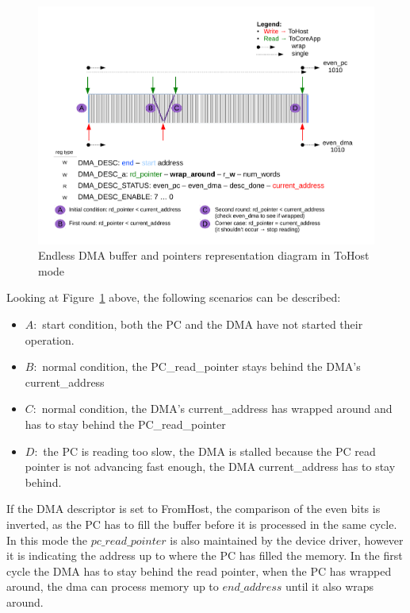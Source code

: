 \begin{figure}[H]
\centering
\includegraphics[width=1\textwidth, page=1]{figures/Endless_DMA_diagram.pdf}
\caption{Endless DMA buffer and pointers representation diagram in ToHost mode}
\label{fig:endless_dma_diagram_tohost}
\end{figure}

Looking at Figure~\ref{fig:endless_dma_diagram_tohost} above, the following scenarios can be described:
\begin{itemize}
	\item $A:$ start condition, both the PC and the DMA have not started their operation.
	\item $B:$ normal condition, the PC\_read\_pointer stays behind the DMA's current\_address
	\item $C:$ normal condition, the DMA's current\_address has wrapped around and has to stay behind the PC\_read\_pointer
	\item $D:$ the PC is reading too slow, the DMA is stalled because the PC read pointer is not advancing fast enough, the DMA current\_address has to stay behind.
\end{itemize}

\newpage
If the DMA descriptor is set to FromHost, the comparison of the even bits is inverted, as the PC has to fill the buffer before it is processed in the same cycle. In this mode the $pc\_read\_pointer$ is also maintained by the device driver, however it is indicating the address up to where the PC has filled the memory. In the first cycle the DMA has to stay behind the read pointer, when the PC has wrapped around, the dma can process memory up to $end\_address$ until it also wraps around.


